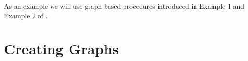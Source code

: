 \documentclass[a4paper, 11pt]{article}\usepackage[]{graphicx}\usepackage[]{color}
\newcommand{\al}{$\alpha$-level\xspace}
\newcommand{\eg}{\em e.g.}
\begin{document}
As an example we will use graph based procedures introduced in
Example 1 and Example 2 of \cite[Sections 2 and 3.2]{Bretz11}. 






\section{Creating Graphs}
\label{sec:creating}
\end{document}
